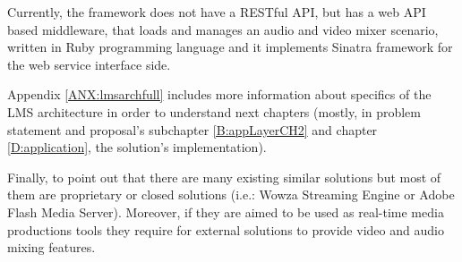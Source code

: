 Currently, the framework does not have a RESTful API, but has a web API based middleware, that loads and manages an audio and video mixer scenario, written in Ruby programming language and it implements Sinatra framework for the web service interface side.

Appendix \ref{ANX:lmsarchfull} includes more information about specifics of the LMS architecture in order to understand next chapters (mostly, in problem statement and proposal's subchapter \ref{B:appLayerCH2} and chapter \ref{D:application}, the solution's implementation).

Finally, to point out that there are many existing similar solutions but most of them are proprietary or closed solutions (i.e.: Wowza Streaming Engine or Adobe Flash Media Server). Moreover, if they are aimed to be used as real-time media productions tools they require for external solutions to provide video and audio mixing features.
